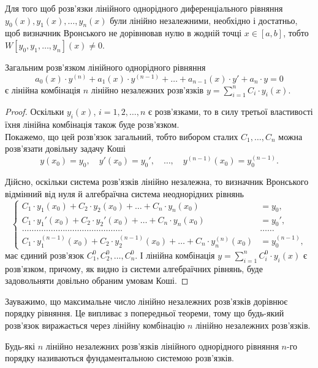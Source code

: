 \begin{theorem}
	Для того щоб розв’язки лінійного однорідного диференціального рівняння $y_0(x), y_1(x), \ldots, y_n(x)$ були лінійно незалежними, необхідно і достатньо, щоб визначник Вронського не дорівнював нулю в жодній точці $x \in [a,b]$, тобто $W[y_0, y_1, \ldots, y_n](x) \ne 0$.
\end{theorem}

\begin{theorem}
	Загальним розв’язком лінійного однорідного рівняння
	\begin{equation*}
		a_0(x) \cdot y^{(n)} + a_1(x) \cdot y^{(n-1)} + \ldots + a_{n-1}(x) \cdot y' + a_n \cdot y = 0
	\end{equation*}
 	є лінійна комбінація $n$ лінійно незалежних розв’язків $y = \sum_{i = 1}^n C_i \cdot y_i(x)$.
\end{theorem}

\begin{proof}
	Оскільки $y_i(x)$, $i = 1, 2, \ldots, n$ є розв’язками, то в силу третьої властивості їхня лінійна комбінація також буде розв’язком. \\

	Покажемо, що цей розв’язок загальний, тобто вибором сталих $C_1, \ldots, C_n$ можна розв’язати довільну задачу Коші
	\begin{equation*}
		y(x_0) = y_0, \quad y'(x_0) = y_0', \quad \ldots, \quad y^{(n - 1)}(x_0) = y_0^{(n - 1)}.
	\end{equation*}

	Дійсно, оскільки система розв’язків лінійно незалежна, то визначник Вронського відмінний від нуля й алгебраїчна система неоднорідних рівнянь
	\begin{equation*}
		\left\{ \begin{aligned}
			C_1 \cdot y_1(x_0) + C_2 \cdot y_2(x_0) + \ldots + C_n \cdot y_n(x_0) &= y_0, \\
			C_1 \cdot y_1'(x_0) + C_2 \cdot y_2'(x_0) + \ldots + C_n \cdot y_n(x_0) &= y_0', \\
			\ldots \ldots \ldots \ldots \ldots \ldots \ldots \ldots \ldots \ldots \ldots \ldots \ldots \ldots & \ldots \ldots \\
			C_1 \cdot y_1^{(n - 1)}(x_0) + C_2 \cdot y_2^{(n - 1)}(x_0) + \ldots + C_n \cdot y_n^{(n)}(x_0) &= y_0^{(n - 1)},
		\end{aligned} \right.
	\end{equation*}
	має єдиний розв’язок $C_1^0, C_2^0, \ldots, C_n^0$. І лінійна комбінація $y = \sum_{i = 1}^n C_i^0 \cdot y_i(x)$ є розв’язком, причому, як видно із системи алгебраїчних рівнянь, буде задовольняти довільно обраним умовам Коші.
\end{proof}

Зауважимо, що максимальне число лінійно незалежних розв’язків дорівнює порядку рівняння. Це випливає з попередньої теореми, тому що будь-який розв’язок виражається через лінійну комбінацію $n$ лінійно незалежних розв’язків.

\begin{definition}
	Будь-які $n$ лінійно незалежних розв’язків лінійного однорідного рівняння $n$-го порядку називаються фундаментальною системою розв’язків.
\end{definition}